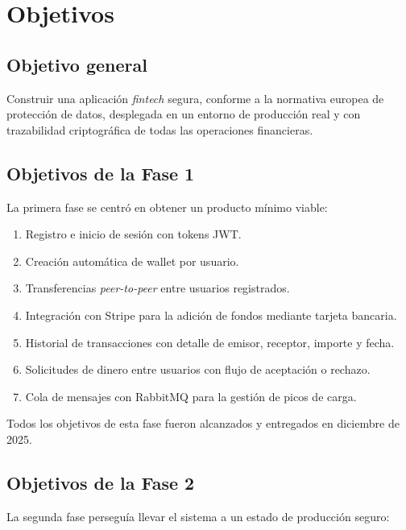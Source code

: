 \chapter{Objetivos}\label{ch:objetivos}

\section{Objetivo general}

Construir una aplicación \emph{fintech} segura, conforme a la normativa europea de protección de datos, desplegada en un entorno de producción real y con trazabilidad criptográfica de todas las operaciones financieras.

\section{Objetivos de la Fase 1}

La primera fase se centró en obtener un producto mínimo viable:

\begin{enumerate}[label=F1.\arabic*]
  \item Registro e inicio de sesión con tokens JWT.
  \item Creación automática de wallet por usuario.
  \item Transferencias \emph{peer-to-peer} entre usuarios registrados.
  \item Integración con Stripe para la adición de fondos mediante tarjeta bancaria.
  \item Historial de transacciones con detalle de emisor, receptor, importe y fecha.
  \item Solicitudes de dinero entre usuarios con flujo de aceptación o rechazo.
  \item Cola de mensajes con RabbitMQ para la gestión de picos de carga.
\end{enumerate}

Todos los objetivos de esta fase fueron alcanzados y entregados en diciembre de 2025.

\section{Objetivos de la Fase 2}

La segunda fase perseguía llevar el sistema a un estado de producción seguro:

